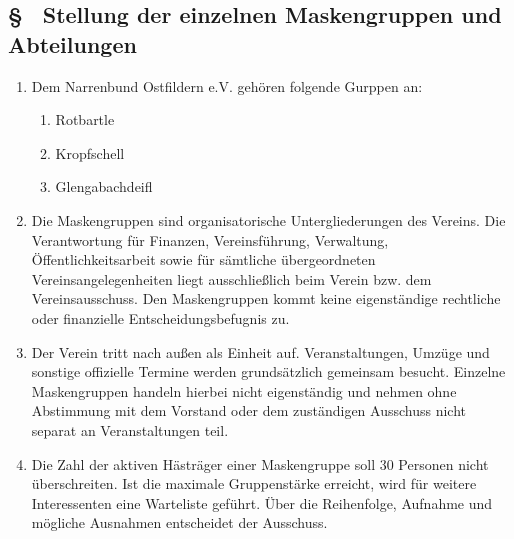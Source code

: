 \subsection{§ \thegoparagraphcounter\ Stellung der einzelnen Maskengruppen und Abteilungen} \label{go:par:maskengruppen_abteilungen}
\begin{enumerate}
    \item \label{go:abs:jr0t2g} Dem Narrenbund Ostfildern e.V. gehören folgende Gurppen an:
    \begin{enumerate}
        \item Rotbartle
        \item Kropfschell
        \item Glengabachdeifl
    \end{enumerate}
    
    \item \label{go:abs:vwhkz5} Die Maskengruppen sind organisatorische Untergliederungen des Vereins. Die Verantwortung für Finanzen, Vereinsführung, Verwaltung, Öffentlichkeitsarbeit sowie für sämtliche übergeordneten Vereinsangelegenheiten liegt ausschließlich beim Verein bzw. dem Vereinsausschuss. Den Maskengruppen kommt keine eigenständige rechtliche oder finanzielle Entscheidungsbefugnis zu.

    \item \label{go:abs:uq4co2} Der Verein tritt nach außen als Einheit auf. Veranstaltungen, Umzüge und sonstige offizielle Termine werden grundsätzlich gemeinsam besucht. Einzelne Maskengruppen handeln hierbei nicht eigenständig und nehmen ohne Abstimmung mit dem Vorstand oder dem zuständigen Ausschuss nicht separat an Veranstaltungen teil.

    \item \label{go:abs:hhschu} Die Zahl der aktiven Hästräger einer Maskengruppe soll 30 Personen nicht überschreiten. Ist die maximale Gruppenstärke erreicht, wird für weitere Interessenten eine Warteliste geführt. Über die Reihenfolge, Aufnahme und mögliche Ausnahmen entscheidet der Ausschuss.
\end{enumerate}

